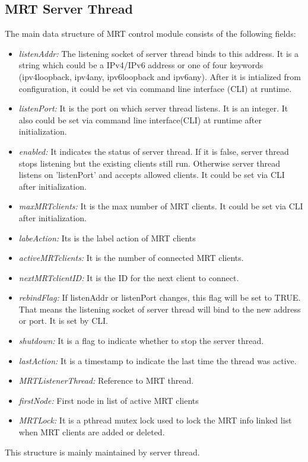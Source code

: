 \subsection{MRT Server Thread}
The main data structure of MRT control module consists of the following fields:
\begin{itemize}
\item{\emph{listenAddr:} The listening socket of server thread binds to this address.  It is a string which could be a IPv4/IPv6 address or one of four keywords (ipv4loopback, ipv4any, ipv6loopback and ipv6any). After it is intialized from configuration, it could be set via command line interface (CLI) at runtime.}
\item{\emph{listenPort:} It is the port on which server thread listens.  It is an integer.  It also could be set via command line interface(CLI) at runtime after initialization.}
\item{\emph{enabled:} It indicates the status of server thread.  If it is false, server thread stops listening but the existing clients still run. Otherwise server thread listens on 'listenPort' and accepts allowed clients. It could be set via CLI after initialization.}
\item{\emph{maxMRTclients:} It is the max number of MRT clients. It could be set via CLI after initialization. }
\item{\emph{labeAction:} Its is the label action of MRT clients}
\item{\emph{activeMRTclients:} It is the number of connected MRT clients. }
\item{\emph{nextMRTclientID:} It is the ID for the next client to connect. }
\item{\emph{rebindFlag:} If listenAddr or listenPort changes, this flag will be set to TRUE. That means the listening socket of server thread will bind to the new address or port. It is set by CLI.  }
\item{\emph{shutdown:} It is a flag to indicate whether to stop the server thread. }
\item{\emph{lastAction:} It is a timestamp to indicate the last time the thread was active. }
\item{\emph{MRTListenerThread:} Reference to MRT thread. }
\item{\emph{firstNode:} First node in list of active MRT clients} 
\item{\emph{MRTLock:} It is a pthread mutex lock used to lock the MRT info linked list when MRT clients are added or deleted. }
\end{itemize}
This structure is mainly maintained by server thread. 

